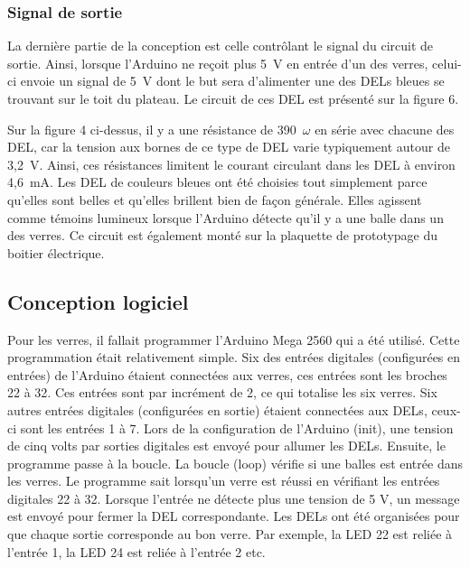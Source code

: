 \subsubsection{Signal de sortie}

La dernière partie de la conception est celle contrôlant le signal du circuit de sortie.
Ainsi, lorsque l’Arduino ne reçoit plus 5~V en entrée d’un des verres, celui-ci envoie un signal de 5~V dont le but sera d’alimenter une des DELs bleues se trouvant sur le toit du plateau.
Le circuit de ces DEL est présenté sur la figure 6.


Sur la figure 4 ci-dessus, il y a une résistance de 390~$\omega$ en série avec chacune des DEL, car la tension aux bornes de ce type de DEL varie typiquement autour de 3,2~V.
Ainsi, ces résistances limitent le courant circulant dans les DEL à environ 4,6~mA.
Les DEL de couleurs bleues ont été choisies tout simplement parce qu’elles sont belles et qu’elles brillent bien de façon générale.
Elles agissent comme témoins lumineux lorsque l’Arduino détecte qu’il y a une balle dans un des verres.
Ce circuit est également monté sur la plaquette de prototypage du boitier électrique.

\subsection{Conception logiciel}



Pour les verres, il fallait programmer l'Arduino Mega 2560 qui a été utilisé.
Cette programmation était relativement simple.
Six des entrées digitales (configurées en entrées) de l'Arduino étaient connectées aux verres, ces entrées sont les broches 22 à 32.
Ces entrées sont par incrément de 2, ce qui totalise les six verres.
Six autres entrées digitales (configurées en sortie) étaient connectées aux DELs, ceux-ci sont les entrées 1 à 7.
Lors de la configuration de l'Arduino (init), une tension de cinq volts par sorties digitales est envoyé pour allumer les DELs.
Ensuite, le programme passe à la boucle.
La boucle (loop) vérifie si une balles est entrée dans les verres.
Le programme sait lorsqu'un verre est réussi en vérifiant les entrées digitales 22 à 32.
Lorsque l'entrée ne détecte plus une tension de 5 V, un message est envoyé pour fermer la DEL correspondante.
Les DELs ont été organisées pour que chaque sortie corresponde au bon verre.
Par exemple, la LED 22 est reliée à l’entrée 1, la LED 24 est reliée à l’entrée 2 etc.

